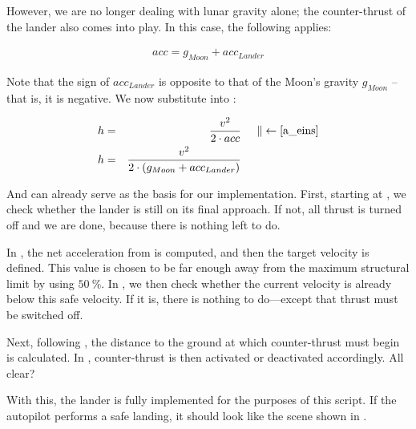 However, we are no longer dealing with lunar gravity alone; the counter-thrust of the lander also comes into play. In this case, the following applies:

\begin{align}
	acc = g_{Moon} + acc_{Lander} \label{a_eins}
\end{align}

Note that the sign of $acc_{Lander}$ is opposite to that of the Moon’s gravity $g_{Moon}$ -- that is, it is negative. We now substitute  into :

\begin{align}
	h &=& \frac{v^2}{2 \cdot acc}&\hspace{0.5cm}\| \leftarrow \ref{a_eins}\nonumber \\
	h &=&\frac{v^2}{2 \cdot (g_{Moon} + acc_{Lander})} \label{h_zwei}
\end{align}

And  can already serve as the basis for our implementation. First, starting at , we check whether the lander is still on its final approach. If not, all thrust is turned off and we are done, because there is nothing left to do.

In , the net acceleration from  is computed, and then the target velocity is defined. This value is chosen to be far enough away from the maximum structural limit by using $\SI{50}{\%}$. In , we then check whether the current velocity is already below this safe velocity. If it is, there is nothing to do—except that thrust must be switched off.

Next, following , the distance to the ground at which counter-thrust must begin is calculated. In , counter-thrust is then activated or deactivated accordingly. All clear?

With this, the lander is fully implemented for the purposes of this script. If the autopilot performs a safe landing, it should look like the scene shown in .






